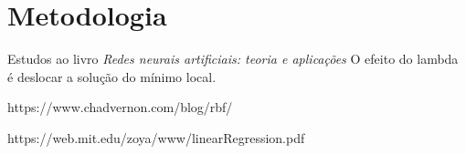 \section{Metodologia}

Estudos ao livro \emph{Redes neurais artificiais: teoria e aplicações} \cite{LivroTexto} 
O efeito do lambda é deslocar a solução do mínimo local.


https://www.chadvernon.com/blog/rbf/

https://web.mit.edu/zoya/www/linearRegression.pdf